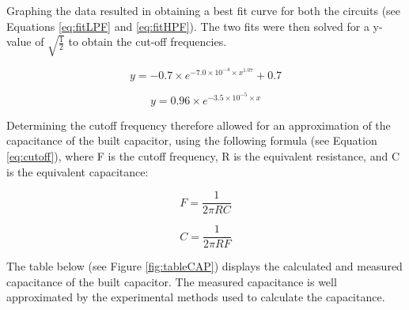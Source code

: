 \documentclass[journal]{IEEEtran}
\begin{document}
\noindent Graphing the data resulted in obtaining a best fit curve for both the circuits (see Equations \ref{eq:fitLPF} and \ref{eq:fitHPF}). The two fits were then solved for a y-value of $\sqrt{\frac{1}{2}}$ to obtain the cut-off frequencies. 


\begin{equation}
y = -0.7 \times e^{-7.0 \times 10^{-4} \times x ^{1.07}}+0.7
\label{eq:fitLPF}
\end{equation}


\begin{equation}
y = 0.96 \times e^{-3.5 \times {10^{-5}} \times x}
\label{eq:fitHPF}
\end{equation}

\noindent Determining the cutoff frequency therefore allowed for an approximation of the capacitance of the built capacitor, using the following formula (see Equation \ref{eq:cutoff}), where F is the cutoff frequency, R is the equivalent resistance, and C is the equivalent capacitance:

\begin{equation}
F = \frac{1}{2\pi RC}
\label{eq:cutoff}
\end{equation}

\begin{equation}
C = \frac{1}{2\pi RF}
\label{eq:cutoff}
\end{equation}



\noindent The table below (see Figure \ref{fig:tableCAP}) displays the calculated and measured capacitance of the built capacitor. The measured capacitance is well approximated by the experimental methods used to calculate the capacitance.  
\end{document}
